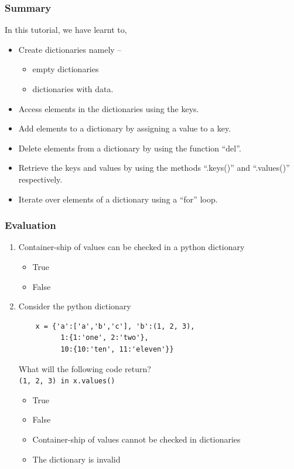 \documentclass[presentation]{beamer}
\begin{document}
\begin{frame}
\frametitle{Summary}
\label{sec-8}

  In this tutorial, we have learnt to,


\begin{itemize}
\item Create dictionaries namely --
\begin{itemize}
\item empty dictionaries
\item dictionaries with data.
\end{itemize}
\item Access elements in the dictionaries using the keys.
\item Add elements to a dictionary by assigning a value to a key.
\item Delete elements from a dictionary by using the function ``del''.
\item Retrieve the keys and values by using the methods ``.keys()'' and 
    ``.values()'' respectively.
\item Iterate over elements of a dictionary using a ``for'' loop.
\end{itemize}
\end{frame}
\begin{frame}[fragile]
\frametitle{Evaluation}
\label{sec-9}


\begin{enumerate}
\item Container-ship of values can be checked in a python dictionary
\begin{itemize}
\item True
\item False
\vspace{5pt}
\end{itemize}
\item Consider the python dictionary 
   
\begin{verbatim}
    x = {'a':['a','b','c'], 'b':(1, 2, 3),
          1:{1:'one', 2:'two'},
          10:{10:'ten', 11:'eleven'}}
\end{verbatim}


   What will the following code return?\\ 
     \verb~(1, 2, 3) in x.values()~
\vspace{3pt}     
\begin{itemize}
\item True
\item False
\item Container-ship of values cannot be checked in dictionaries
\item The dictionary is invalid
\end{itemize}
\end{enumerate}
\end{frame}
\end{document}
